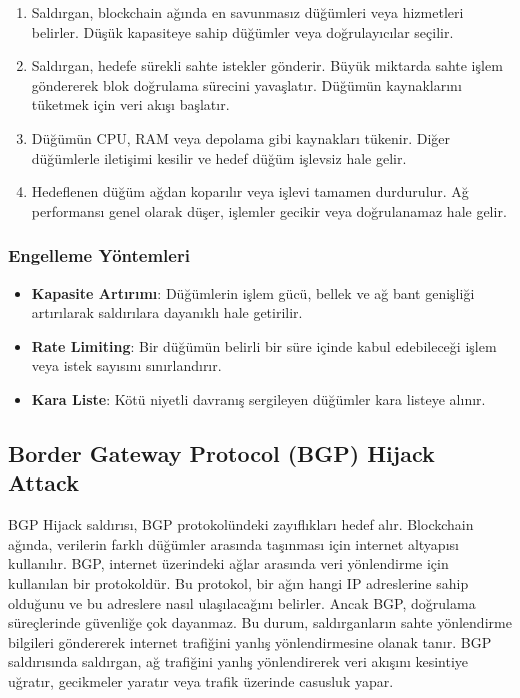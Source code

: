 \begin{enumerate}
    \item Saldırgan, blockchain ağında en savunmasız düğümleri veya hizmetleri belirler. Düşük kapasiteye sahip düğümler veya doğrulayıcılar seçilir.
    \item Saldırgan, hedefe sürekli sahte istekler gönderir. Büyük miktarda sahte işlem göndererek blok doğrulama sürecini yavaşlatır. Düğümün kaynaklarını tüketmek için veri akışı başlatır.
    \item Düğümün CPU, RAM veya depolama gibi kaynakları tükenir. Diğer düğümlerle iletişimi kesilir ve hedef düğüm işlevsiz hale gelir.
    \item Hedeflenen düğüm ağdan koparılır veya işlevi tamamen durdurulur. Ağ performansı genel olarak düşer, işlemler gecikir veya doğrulanamaz hale gelir.
\end{enumerate}

\subsubsection{Engelleme Yöntemleri}

\begin{itemize}
    \item \textbf{Kapasite Artırımı}: Düğümlerin işlem gücü, bellek ve ağ bant genişliği artırılarak saldırılara dayanıklı hale getirilir.
    \item \textbf{Rate Limiting}: Bir düğümün belirli bir süre içinde kabul edebileceği işlem veya istek sayısını sınırlandırır.
    \item \textbf{Kara Liste}: Kötü niyetli davranış sergileyen düğümler kara listeye alınır.
\end{itemize}

\newpage

\subsection{Border Gateway Protocol (BGP) Hijack Attack}

BGP Hijack saldırısı, BGP protokolündeki zayıflıkları hedef alır. Blockchain ağında, verilerin farklı düğümler arasında taşınması için internet altyapısı kullanılır. BGP, internet üzerindeki ağlar arasında veri yönlendirme için kullanılan bir protokoldür. Bu protokol, bir ağın hangi IP adreslerine sahip olduğunu ve bu adreslere nasıl ulaşılacağını belirler. Ancak BGP, doğrulama süreçlerinde güvenliğe çok dayanmaz. Bu durum, saldırganların sahte yönlendirme bilgileri göndererek internet trafiğini yanlış yönlendirmesine olanak tanır. BGP saldırısında saldırgan, ağ trafiğini yanlış yönlendirerek veri akışını kesintiye uğratır, gecikmeler yaratır veya trafik üzerinde casusluk yapar. 

